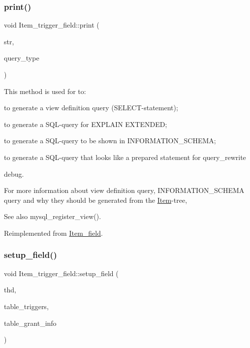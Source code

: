 \subsubsection{\texorpdfstring{print()}{print()}}
{\footnotesize\ttfamily void Item\+\_\+trigger\+\_\+field\+::print (\begin{DoxyParamCaption}\item[{String $\ast$}]{str,  }\item[{enum\+\_\+query\+\_\+type}]{query\+\_\+type }\end{DoxyParamCaption})\hspace{0.3cm}{\ttfamily [virtual]}}

This method is used for to\+:
\begin{DoxyItemize}
\item to generate a view definition query (S\+E\+L\+E\+CT-\/statement);
\item to generate a S\+QL-\/query for E\+X\+P\+L\+A\+IN E\+X\+T\+E\+N\+D\+ED;
\item to generate a S\+QL-\/query to be shown in I\+N\+F\+O\+R\+M\+A\+T\+I\+O\+N\+\_\+\+S\+C\+H\+E\+MA;
\item to generate a S\+QL-\/query that looks like a prepared statement for query\+\_\+rewrite
\item debug.
\end{DoxyItemize}

For more information about view definition query, I\+N\+F\+O\+R\+M\+A\+T\+I\+O\+N\+\_\+\+S\+C\+H\+E\+MA query and why they should be generated from the \mbox{\hyperlink{classItem}{Item}}-\/tree, \begin{DoxySeeAlso}{See also}
mysql\+\_\+register\+\_\+view(). 
\end{DoxySeeAlso}


Reimplemented from \mbox{\hyperlink{classItem__field_a40b28e2bc9886f81e8ad19c64efb1408}{Item\+\_\+field}}.

\mbox{\label{classItem__trigger__field_a4d1d3c955aad1b680dbed2cbcca5b466}} 
\subsubsection{\texorpdfstring{setup\+\_\+field()}{setup\_field()}}
{\footnotesize\ttfamily void Item\+\_\+trigger\+\_\+field\+::setup\+\_\+field (\begin{DoxyParamCaption}\item[{T\+HD $\ast$}]{thd,  }\item[{\mbox{\hyperlink{classTable__trigger__field__support}{Table\+\_\+trigger\+\_\+field\+\_\+support}} $\ast$}]{table\+\_\+triggers,  }\item[{\mbox{\hyperlink{structGRANT__INFO}{G\+R\+A\+N\+T\+\_\+\+I\+N\+FO}} $\ast$}]{table\+\_\+grant\+\_\+info }\end{DoxyParamCaption})}

